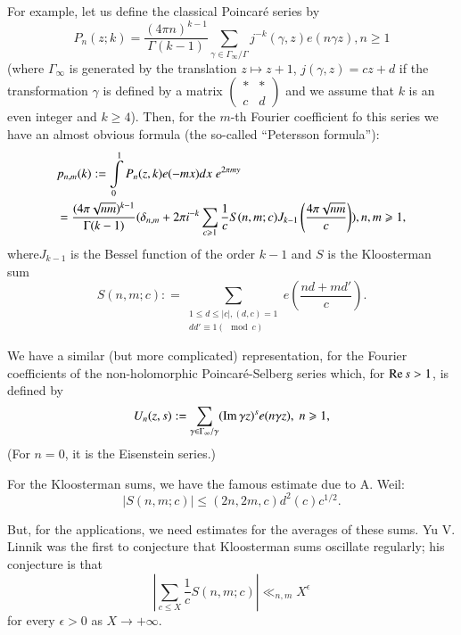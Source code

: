 For example, let us define the classical Poincar\'e series by 
\begin{equation}
P_n (z;k) = \frac{(4\pi n)^{k-1}}{\Gamma (k-1)} \sum\limits_{\gamma \in \Gamma_\infty / \Gamma} j^{-k} (\gamma, z) e (n\gamma z), n \geqslant 1 \label{art7-eq1.5}
\end{equation}
(where $\Gamma_\infty$ is generated by the translation $z \mapsto z + 1$, $j(\gamma, z) = cz + d$ if the transformation $\gamma$ is defined by a matrix $\left(\begin{smallmatrix}
\ast & \ast\\
c & d
\end{smallmatrix} \right)$ and we assume that $k$ is an even integer and $k \geqslant 4$). Then, for the $m$-th Fourier coefficient fo this series we have an almost obvious formula (the so-called ``Petersson formula''):
\begin{align}
&p_{n,m} (k) :  = \int\limits^1_0 P_n (z,k) e (-mx) dx \; e^{2\pi my}\label{art7-eq1.6}\\
 & = \frac{(4\pi \sqrt{nm})^{k-1}}{\Gamma (k-1)} (\delta_{n,m} + 2 \pi i^{-k} \sum\limits_{c \geqslant 1} \frac{1}{c} S (n, m; c) J_{k-1} \left( \frac{4\pi \sqrt{nm}}{c}\right)), n, m \geqslant 1, \notag
\end{align}
where\pageoriginale $J_{k-1}$ is the Bessel function of the order $k-1$ and $S$ is the Kloosterman sum
\begin{equation}
S(n, m;c): =  \sum\limits_{\substack{1\leqslant d \leqslant |c|, (d,c) =1\\ dd' \equiv 1 (\mod c)}} e \left(\frac{nd+md'}{c} \right).
\label{art7-eq1.7}
\end{equation}

We have a similar (but more complicated) representation, for the Fourier coefficients of the non-holomorphic Poincar\'e-Selberg series which, for $\operatorname{Re} s>1$, is defined by 
\begin{equation}
U_n(z,s) : = \sum\limits_{\gamma \in \Gamma_\infty / \gamma} (\operatorname{Im} \gamma z)^s e (n \gamma z), \; n \geqslant 1, \label{art7-eq1.8}
\end{equation}
(For $n=0$, it is the Eisenstein series.)

For the Kloosterman sums, we have the famous estimate due to A. Weil:
\begin{equation}
|S(n, m; c)| \leqslant (2n, 2m, c) d^2 (c) c^{1/2}. \label{art7-eq1.9}
\end{equation}

But, for the applications, we need estimates for the averages of these sums. Yu V. Linnik was the first to conjecture that Kloosterman sums oscillate regularly; his conjecture is that
\begin{equation}
\left|\sum\limits_{c \leqslant X} \frac{1}{c} S (n, m; c) \right| \ll_{n,m} X^\epsilon \label{art7-eq1.10}
\end{equation}
for every $\epsilon > 0$ as $X  \to + \infty$.

